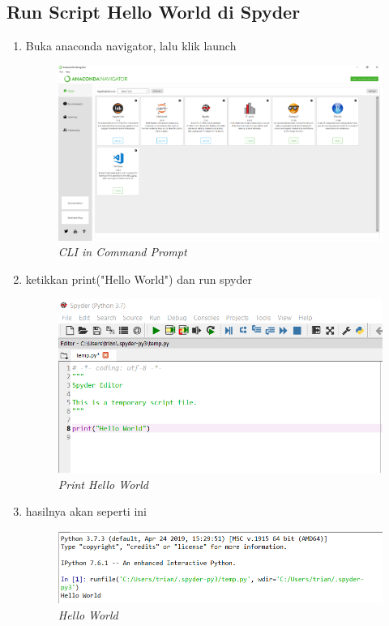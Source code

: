 \subsection{Run Script Hello World di Spyder}
\begin{enumerate}
\item Buka anaconda navigator, lalu klik launch
\begin{figure}[H]
    \centering
    \includegraphics[scale=0.3]{figures/navigator}
    \caption{\textit{CLI in Command Prompt}}
    \label{Anaconda Navigator}
\end{figure}
\item ketikkan print("Hello World") dan run spyder
\begin{figure}[H]
    \centering
    \includegraphics[scale=0.6]{figures/helloworld}
    \caption{\textit{Print Hello World}}
    \label{Print Hello World}
\end{figure}
\item hasilnya akan seperti ini
\begin{figure}[H]
    \centering
    \includegraphics[scale=0.6]{figures/run}
    \caption{\textit{Hello World}}
    \label{Hello World}
\end{figure}
\end{enumerate}

